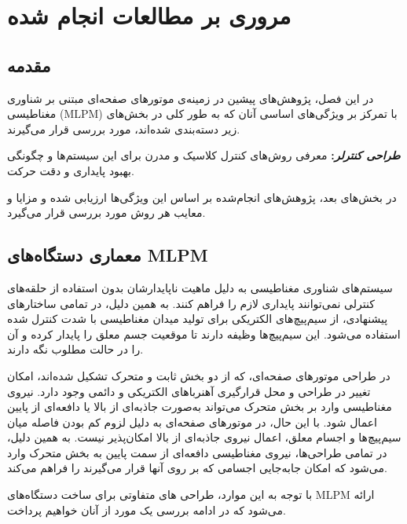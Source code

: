 \setcounter{topnumber}{5}      %
\setcounter{totalnumber}{5}    %
\renewcommand{\floatpagefraction}{.8}  %

\chapter{مروری بر مطالعات انجام شده}
\section{مقدمه}
در این فصل، پژوهش‌های پیشین در زمینه‌ی موتورهای صفحه‌ای مبتنی بر شناوری مغناطیسی (MLPM) با تمرکز بر ویژگی‌های اساسی آنان که به طور کلی در بخش‌های زیر دسته‌بندی شده‌اند، مورد بررسی قرار می‌گیرند. 

	\textbf{\textit{طراحی کنترلر}:}
	معرفی روش‌های کنترل کلاسیک و مدرن برای این سیستم‌ها و چگونگی بهبود پایداری و دقت حرکت.


در بخش‌های بعد، پژوهش‌های انجام‌شده بر اساس این ویژگی‌ها ارزیابی شده و مزایا و معایب هر روش مورد بررسی قرار می‌گیرد.

\section{معماری دستگاه‌های MLPM}
سیستم‌های شناوری مغناطیسی به دلیل ماهیت ناپایدارشان بدون استفاده از حلقه‌های کنترلی نمی‌توانند پایداری لازم را فراهم کنند. به همین دلیل، در تمامی ساختارهای پیشنهادی، از سیم‌پیچ‌های الکتریکی برای تولید میدان مغناطیسی با شدت کنترل ‌شده استفاده می‌شود. این سیم‌پیچ‌ها وظیفه دارند تا موقعیت جسم معلق را پایدار کرده و آن را در حالت مطلوب نگه ‌دارند.

در طراحی موتورهای صفحه‌ای، که از دو بخش ثابت
و متحرک
تشکیل شده‌اند، امکان تغییر در طراحی و محل قرارگیری آهنرباهای الکتریکی و دائمی وجود دارد. نیروی مغناطیسی وارد بر بخش متحرک می‌تواند به‌صورت جاذبه‌ای از بالا یا دافعه‌ای از پایین اعمال شود. با این حال، در موتورهای صفحه‌ای به دلیل لزوم کم بودن فاصله میان سیم‌پیچ‌ها و اجسام معلق، اعمال نیروی جاذبه‌ای از بالا امکان‌پذیر نیست. به همین دلیل، در تمامی طراحی‌ها، نیروی مغناطیسی دافعه‌ای از سمت پایین به بخش متحرک وارد می‌شود که امکان جابه‌جایی اجسامی که بر روی آنها قرار می‌گیرند را فراهم می‌کند.

با توجه به این موارد، طراحی های متفاوتی برای ساخت دستگاه‌های MLPM ارائه می‌شود که در ادامه بررسی یک مورد از آنان خواهیم پرداخت.


